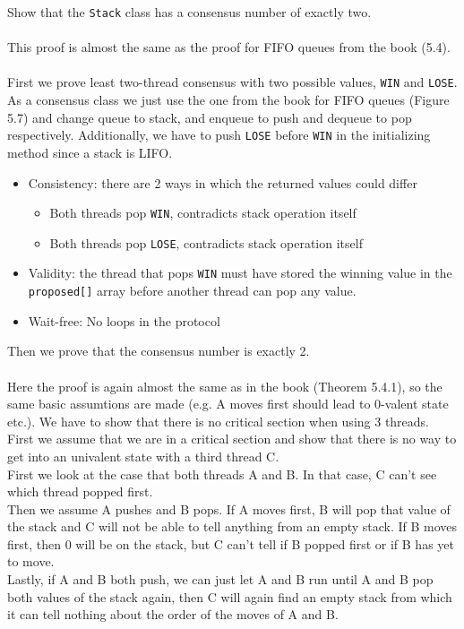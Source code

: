 \documentclass[a4paper,%
11pt,%
DIV=14,
headsepline,%
headings=normal,
]{scrartcl}
\begin{document}
Show that the \texttt{Stack} class has a consensus number of exactly two.\\
\\
This proof is almost the same as the proof for FIFO queues from the book (5.4).\\
\\
First we prove least two-thread consensus with two possible values, \texttt{WIN} and \texttt{LOSE}. As a consensus class we just use the one from the book for FIFO queues (Figure 5.7) and change queue to stack, and enqueue to push and dequeue to pop respectively. Additionally, we have to push \texttt{LOSE} before \texttt{WIN} in the initializing method since a stack is LIFO.
\begin{itemize}
\item Consistency: there are 2 ways in which the returned values could differ
	\begin{itemize}
	\item Both threads pop \texttt{WIN}, contradicts stack operation itself
	\item Both threads pop \texttt{LOSE}, contradicts stack operation itself
	\end{itemize}
\item Validity: the thread that pops \texttt{WIN} must have stored the winning value in the \texttt{proposed[]} array before another thread can pop any value.
\item Wait-free: No loops in the protocol
\end{itemize}

Then we prove that the consensus number is exactly 2.\\
\\
Here the proof is again almost the same as in the book (Theorem 5.4.1), so the same basic assumtions are made (e.g. A moves first should lead to 0-valent state etc.). We have to show that there is no critical section when using 3 threads. First we assume that we are in a critical section and show that there is no way to get into an univalent state with a third thread C.\\
First we look at the case that both threads A and B. In that case, C can't see which thread popped first.\\
Then we assume A pushes and B pops. If A moves first, B will pop that value of the stack and C will not be able to tell anything from an empty stack. If B moves first, then 0 will be on the stack, but C can't tell if B popped first or if B has yet to move.\\
Lastly, if A and B both push, we can just let A and B run until A and B pop both values of the stack again, then C will again find an empty stack from which it can tell nothing about the order of the moves of A and B.
\end{document}
